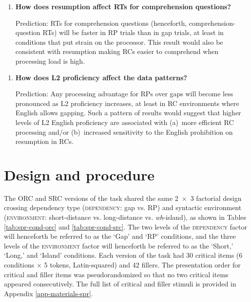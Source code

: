 \begin{enumerate}[\bfseries RQ3:,itemsep=5pt]
\item {\bfseries How does resumption affect RTs for comprehension questions?}\par\nobreak
Prediction: RTs for comprehension questions (henceforth, comprehension-question RTs) will be faster in RP trials than in gap trials, at least in conditions that put strain on the processor. This result would also be consistent with resumption making RCs easier to comprehend when processing load is high.
\end{enumerate}\vspace{5pt}

\begin{enumerate}[\bfseries RQ4:,itemsep=5pt]
\item {\bfseries How does L2 proficiency affect the data patterns?}\par\nobreak
Prediction: Any processing advantage for RPs over gaps will become less pronounced as L2 proficiency increases, at least in RC environments where English allows gapping. Such a pattern of results would suggest that higher levels of L2 English proficiency are associated with (a)~more efficient RC processing and/or (b)~increased sensitivity to the English prohibition on resumption in RCs.
\end{enumerate}

\section{Design and procedure}\label{spr-design}

The ORC and SRC versions of the task shared the same 2~×~3 factorial design crossing dependency type (\textsc{dependency}: gap vs. RP) and syntactic environment (\textsc{environment}: short-distance vs. long-distance vs. \textit{wh}-island), as shown in Tables \ref{tab:spr-cond-orc} and \ref{tab:spr-cond-src}. The two levels of the \textsc{dependency} factor will henceforth be referred to as the `Gap' and `RP' conditions, and the three levels of the \textsc{environment} factor will henceforth be referred to as the `Short,' `Long,' and `Island' conditions.  Each version of the task had 30 critical items (6 conditions × 5 tokens, Latin-squared) and 42 fillers. The presentation order for critical and filler items was pseudorandomized so that no two critical items appeared consecutively. The full list of critical and filler stimuli is provided in Appendix \ref{app-materials-spr}.

